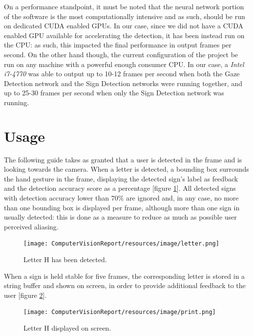 \documentclass[a4paper, 12pt]{article}
\begin{document}
On a performance standpoint, it must be noted that the neural network portion of the software is the most computationally intensive and as such, should be run on dedicated CUDA enabled GPUs.\linebreak
In our case, since we did not have a CUDA enabled GPU available for accelerating the detection, it has been instead run on the CPU: as such, this impacted the final performance in output frames per second. On the other hand though, the current configuration of the project be run on any machine with a powerful enough consumer CPU.\linebreak
In our case, a \textit{Intel i7-4770} was able to output up to 10-12 frames per second when both the Gaze Detection network and the Sign Detection networks were running together, and up to 25-30 frames per second when only the Sign Detection network was running.\linebreak

\section{Usage}
\label{Usage}
The following guide takes as granted that a user is detected in the frame and is looking towards the camera.\linebreak
When a letter is detected, a bounding box surrounds the hand gesture in the frame, displaying the detected sign's label as feedback and the detection accuracy score as a percentage [figure \ref{fig:letter}].\linebreak
All detected signs with detection accuracy lower than $70\%$ are ignored and, in any case, no more than one bounding box is displayed per frame, although more than one sign in usually detected: this is done as a measure to reduce as much as possible user perceived aliasing.\linebreak

\begin{figure}[!h]
    \centering
    \texttt{[image: ComputerVisionReport/resources/image/letter.png]} \caption{Letter H has been detected.} \label{fig:letter}
\end{figure}

When a sign is held stable for five frames, the corresponding letter is stored in a string buffer and shown on screen, in order to provide additional feedback to the user [figure \ref{fig:print}].\linebreak

\begin{figure}[H]
    \centering
    \texttt{[image: ComputerVisionReport/resources/image/print.png]} \caption{Letter H displayed on screen.} \label{fig:print}
\end{figure}
\end{document}
